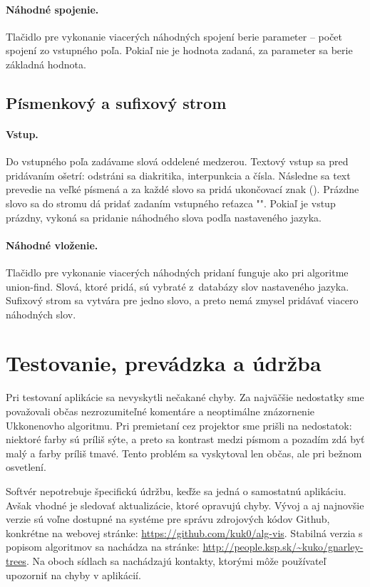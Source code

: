 \paragraph{Náhodné spojenie.} Tlačidlo pre vykonanie viacerých náhodných 
spojení berie parameter -- počet spojení zo vstupného poľa. Pokiaľ nie je 
hodnota zadaná, za parameter sa berie základná hodnota.

\subsection{Písmenkový a sufixový strom}

\paragraph{Vstup.} Do vstupného poľa zadávame slová oddelené medzerou. Textový 
vstup sa pred pridávaním ošetrí: odstráni sa diakritika, interpunkcia a čísla. 
Následne sa text prevedie na veľké písmená a za každé slovo sa pridá 
ukončovací znak (\uz). Prázdne slovo sa do stromu dá pridať zadaním vstupného 
reťazca "\uz". Pokiaľ je vstup prázdny, vykoná sa pridanie náhodného slova 
podľa nastaveného jazyka.

\paragraph{Náhodné vloženie.} Tlačidlo pre vykonanie viacerých náhodných 
pridaní funguje ako pri algoritme union-find. Slová, ktoré pridá, sú vybraté 
z~databázy slov nastaveného jazyka. Sufixový strom sa vytvára pre jedno 
slovo, a preto nemá zmysel pridávať viacero náhodných slov.


\section{Testovanie, prevádzka a údržba}\label{sec:im:test}

Pri testovaní aplikácie sa nevyskytli nečakané chyby. Za najväčšie nedostatky 
sme považovali občas nezrozumiteľné komentáre a neoptimálne znázornenie 
Ukkonenovho algoritmu. Pri premietaní cez projektor sme prišli na nedostatok: 
niektoré farby sú príliš sýte, a preto sa kontrast medzi písmom a pozadím zdá 
byť malý a farby príliš tmavé. Tento problém sa vyskytoval len občas, ale 
pri bežnom osvetlení.

Softvér nepotrebuje špecifickú údržbu, keďže sa jedná o samostatnú aplikáciu. 
Avšak vhodné je sledovať aktualizácie, ktoré opravujú chyby. Vývoj a aj 
najnovšie verzie sú voľne dostupné na systéme pre správu zdrojových kódov 
Github, konkrétne na webovej stránke: \url{https://github.com/kuk0/alg-vis}. 
Stabilná verzia s popisom algoritmov sa nachádza na stránke: 
\url{http://people.ksp.sk/~kuko/gnarley-trees}. Na oboch sídlach sa nachádzajú 
kontakty, ktorými môže používateľ upozorniť na chyby v aplikácií.



